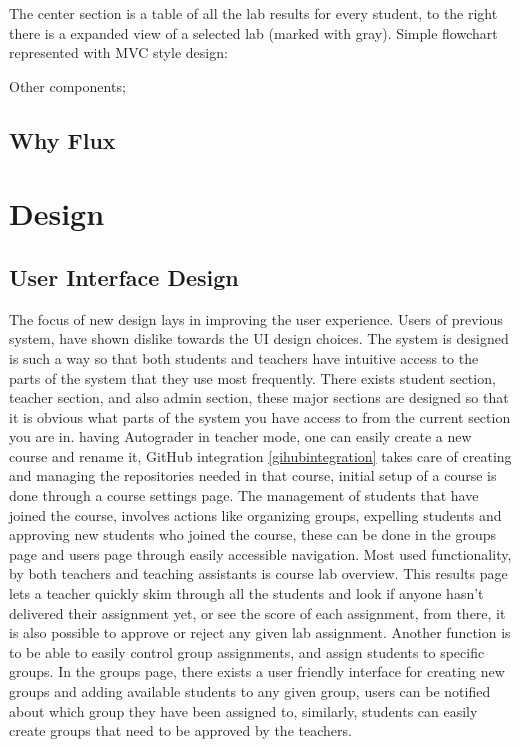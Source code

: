 The center section is a table of all the lab results for every student, to the right there is a expanded view of a selected lab (marked with gray).
Simple flowchart represented with MVC style design:

Other components;



\subsection{Why Flux}

\section{Design}

\subsection{User Interface Design}
The focus of new design lays in improving the user experience. Users of previous system, have shown dislike towards the UI design choices. The system is designed is such a way so that both students and teachers have intuitive access to the parts of the system that they use most frequently. There exists student section, teacher section, and also admin section, these major sections are designed so that it is obvious what parts of the system you have access to from the current section you are in. having Autograder in teacher mode, one can easily create a new course and rename it, GitHub integration \ref{gihubintegration} takes care of creating and managing the repositories needed in that course, initial setup of a course is done through a course settings page. The management of students that have joined the course, involves actions like organizing groups, expelling students and approving new students who joined the course, these can be done in the groups page and users page through easily accessible navigation. Most used functionality, by both teachers and teaching assistants is course lab overview. This results page lets a teacher quickly skim through all the students and look if anyone hasn't delivered their assignment yet, or see the score of each assignment, from there, it is also possible to approve or reject any given lab assignment. Another function is to be able to easily control group assignments, and assign students to specific groups. In the groups page, there exists a user friendly interface for creating new groups and adding available students to any given group, users can be notified about which group they have been assigned to, similarly, students can easily create groups that need to be approved by the teachers.
